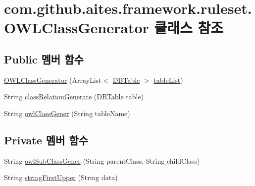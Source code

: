 \hypertarget{classcom_1_1github_1_1aites_1_1framework_1_1ruleset_1_1_o_w_l_class_generator}{}\section{com.\+github.\+aites.\+framework.\+ruleset.\+O\+W\+L\+Class\+Generator 클래스 참조}
\label{classcom_1_1github_1_1aites_1_1framework_1_1ruleset_1_1_o_w_l_class_generator}
\subsection*{Public 멤버 함수}
\begin{DoxyCompactItemize}
\item 
\mbox{\hyperlink{classcom_1_1github_1_1aites_1_1framework_1_1ruleset_1_1_o_w_l_class_generator_a3dc38422903dea3df10a67feac47b6f5}{O\+W\+L\+Class\+Generator}} (Array\+List$<$ \mbox{\hyperlink{classcom_1_1github_1_1aites_1_1framework_1_1dbcomponent_1_1_d_b_table}{D\+B\+Table}} $>$ \mbox{\hyperlink{classcom_1_1github_1_1aites_1_1framework_1_1ruleset_1_1_o_w_l_class_generator_a994d90ead25bc6713618ff0dbff19445}{table\+List}})
\item 
String \mbox{\hyperlink{classcom_1_1github_1_1aites_1_1framework_1_1ruleset_1_1_o_w_l_class_generator_a4082d2b8575df9309689edeb347c115f}{class\+Relation\+Generate}} (\mbox{\hyperlink{classcom_1_1github_1_1aites_1_1framework_1_1dbcomponent_1_1_d_b_table}{D\+B\+Table}} table)
\item 
String \mbox{\hyperlink{classcom_1_1github_1_1aites_1_1framework_1_1ruleset_1_1_o_w_l_class_generator_a0a7572b2b06c6ebb8a9b1786e607f6ff}{owl\+Class\+Gener}} (String table\+Name)
\end{DoxyCompactItemize}
\subsection*{Private 멤버 함수}
\begin{DoxyCompactItemize}
\item 
String \mbox{\hyperlink{classcom_1_1github_1_1aites_1_1framework_1_1ruleset_1_1_o_w_l_class_generator_a0cf36bb6d9f8f69733fec05db8c82f09}{owl\+Sub\+Class\+Gener}} (String parent\+Class, String child\+Class)
\item 
String \mbox{\hyperlink{classcom_1_1github_1_1aites_1_1framework_1_1ruleset_1_1_o_w_l_class_generator_aff3030ae03e75f8aa2b2114fc9a526d8}{string\+First\+Upper}} (String data)
\end{DoxyCompactItemize}
